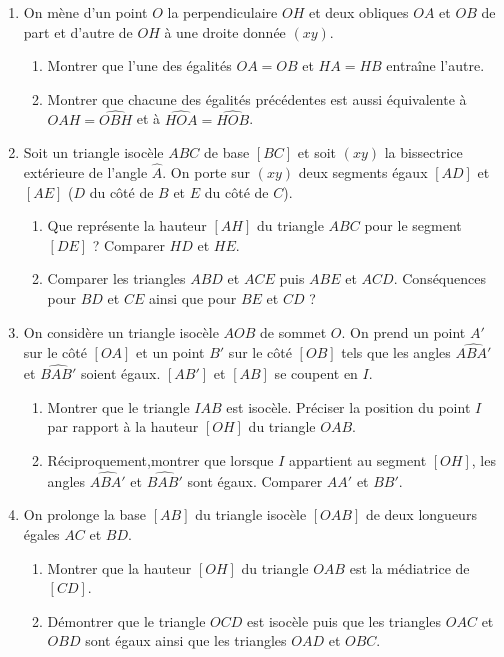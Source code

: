 \begin{enumerate}
\begin{enumerate}
\end{enumerate}
\item On mène d'un point $O$ la perpendiculaire $OH$ et deux obliques $OA$ et $OB$ de part et d'autre de $OH$ à une droite donnée $(xy)$.
\begin{enumerate}
\item Montrer que l'une des égalités $OA=OB$ et $HA=HB$ entraîne l'autre. 
\item Montrer que chacune des égalités précédentes est aussi équivalente à $\widehat{OAH} = \widehat{OBH}$ et à $\widehat{HOA}=\widehat{HOB}$.
\end{enumerate}
\item Soit un triangle isocèle $ABC$ de base $[BC]$ et soit $(xy)$ la bissectrice extérieure de l'angle $\widehat{A}$. On porte sur $(xy)$ deux segments égaux $[AD]$
et $[AE]$ ($D$ du côté de $B$ et $E$ du côté de $C$).\begin{enumerate}
\item Que représente la hauteur $[AH]$ du triangle $ABC$ pour le segment $[DE]$ ?
Comparer $HD$ et $HE$. 
\item Comparer les triangles $ABD$ et $ACE$ puis $ABE$ et $ACD$. Conséquences
pour $BD$ et $CE$ ainsi que pour $BE$ et $CD$ ? 
\end{enumerate}
\item On considère un triangle isocèle $AOB$ de sommet $O$. On prend un point $A'$ sur le côté $[OA]$ et un point $B'$ sur le côté $[OB]$ tels que les angles 
$\widehat{ABA'}$ et $\widehat{BAB'}$ soient égaux. $[AB']$ et $[AB]$ se coupent en $I$.\begin{enumerate}
\item Montrer que le triangle $IAB$ est isocèle. Préciser la position du point $I$
par rapport à la hauteur $[OH]$ du triangle $OAB$. 
\item Réciproquement,montrer que lorsque $I$ appartient au segment $[OH]$, les 
angles $\widehat{ABA'}$ et $\widehat{BAB'}$ sont égaux. Comparer $AA'$ et $BB'$.
\end{enumerate}
\item On prolonge la base $[AB]$ du triangle isocèle $[OAB]$ de deux longueurs égales
$AC$ et $BD$.\begin{enumerate}
\item Montrer que la hauteur $[OH]$ du triangle $OAB$ est la médiatrice de $[CD]$.
\item Démontrer que le triangle $OCD$ est isocèle puis que les triangles $OAC$ 
et $OBD$ sont égaux ainsi que les triangles $OAD$ et $OBC$.

\end{enumerate}
\end{enumerate}
